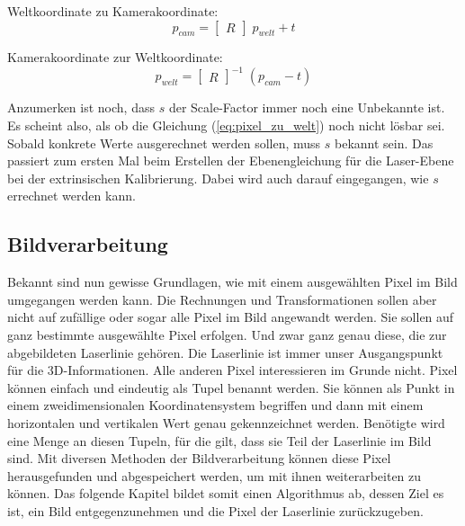	Weltkoordinate zu Kamerakoordinate:
	\begin{equation}
	p_{cam} = \begin{bmatrix} R \end{bmatrix} \; p_{welt} + t
	\label{eq:welt_zu_kamera}
	\end{equation}
	
	Kamerakoordinate zur Weltkoordinate:
	\begin{equation}
	p_{welt} = \begin{bmatrix} R \end{bmatrix}^{-1} \; (p_{cam} - t)
	\label{eq:kamera_zu_welt}
	\end{equation}
	
	Anzumerken ist noch, dass \( s \) der Scale-Factor immer noch eine Unbekannte ist. Es scheint also, als ob die Gleichung (\ref{eq:pixel_zu_welt}) noch nicht lösbar sei. Sobald konkrete Werte ausgerechnet werden sollen, muss \( s \) bekannt sein. Das passiert zum ersten Mal beim Erstellen der Ebenengleichung für die Laser-Ebene bei der extrinsischen Kalibrierung. Dabei wird auch darauf eingegangen, wie \( s \) errechnet werden kann.  
	
	\newpage
	
	\label{chap:transformationen}
	\subsection{Bildverarbeitung}
	Bekannt sind nun gewisse Grundlagen, wie mit einem ausgewählten Pixel im Bild umgegangen werden kann. Die Rechnungen und Transformationen sollen aber nicht auf zufällige oder sogar alle Pixel im Bild angewandt werden. Sie sollen auf ganz bestimmte ausgewählte Pixel erfolgen. Und zwar ganz genau diese, die zur abgebildeten Laserlinie gehören. Die Laserlinie ist immer unser Ausgangspunkt für die 3D-Informationen. Alle anderen Pixel interessieren im Grunde nicht. \newline
	Pixel können einfach und eindeutig als Tupel benannt werden. Sie können als Punkt in einem zweidimensionalen Koordinatensystem begriffen und dann mit einem horizontalen und vertikalen Wert genau gekennzeichnet werden. Benötigte wird eine Menge an diesen Tupeln, für die gilt, dass sie Teil der Laserlinie im Bild sind. Mit diversen Methoden der Bildverarbeitung können diese Pixel herausgefunden und abgespeichert werden, um mit ihnen weiterarbeiten zu können. Das folgende Kapitel bildet somit einen Algorithmus ab, dessen Ziel es ist, ein Bild entgegenzunehmen und die Pixel der Laserlinie zurückzugeben. 
	
